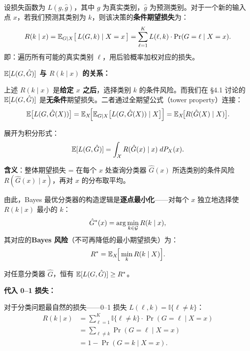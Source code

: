 设损失函数为 $L(g, \hat{g})$，其中 $g$ 为真实类别，$\hat{g}$ 为预测类别。对于一个新的输入点 $x$，若我们预测其类别为 $k$，则该决策的\textbf{条件期望损失}为：
\begin{equation}\label{eq:cond_risk}
    R(k \mid x) = \mathbb{E}_{G\mid X}\big[\,L(G, k) \mid X = x\,\big]
    = \sum_{\ell=1}^{K} L(\ell, k) \cdot \Pr(G = \ell \mid X = x).
\end{equation}
即：遍历所有可能的真实类别 $\ell$，用后验概率加权对应的损失。

\medskip
\noindent\textbf{$\mathbb{E}[L(G, \hat{G})]$ 与 $R(k \mid x)$ 的关系：}

上述 $R(k \mid x)$ 是\textbf{给定 $x$ 之后}，选择类别 $k$ 的条件风险。而我们在 §4.1 讨论的 $\mathbb{E}[L(G, \hat{G})]$ 是\textbf{无条件}期望损失。二者通过全期望公式（tower property）连接：
\begin{equation}\label{eq:tower_risk}
    \mathbb{E}\big[L(G, \hat{G}(X))\big]
    = \mathbb{E}_X\!\Big[\mathbb{E}_{G\mid X}\big[L(G, \hat{G}(X)) \mid X\big]\Big]
    = \mathbb{E}_X\!\big[R(\hat{G}(X) \mid X)\big].
\end{equation}

展开为积分形式：
\[
\mathbb{E}[L(G, \hat{G})] = \int_{\mathcal{X}} R(\hat{G}(x) \mid x) \; dP_X(x).
\]

\textbf{含义}：整体期望损失 = 在每个 $x$ 处查询分类器 $\hat{G}(x)$ 所选类别的条件风险 $R(\hat{G}(x)\mid x)$，再对 $x$ 的分布取平均。

由此，Bayes 最优分类器的构造逻辑是\textbf{逐点最小化}——对每个 $x$ 独立地选择使 $R(k\mid x)$ 最小的 $k$：
\begin{equation}\label{eq:bayes_pointwise}
    \hat{G}^*(x) = \arg\min_{k \in \mathcal{G}} R(k \mid x),
\end{equation}
其对应的\textbf{Bayes 风险}（不可再降低的最小期望损失）为：
\begin{equation}\label{eq:bayes_risk}
    R^* = \mathbb{E}_X\!\Big[\min_{k} R(k \mid X)\Big].
\end{equation}

对任意分类器 $\hat{G}$，恒有 $\mathbb{E}[L(G, \hat{G})] \ge R^*$。

\medskip
\noindent\textbf{代入 0--1 损失：}

对于分类问题最自然的损失——0--1 损失 $L(\ell, k) = \mathbb{I}\{\ell \neq k\}$：
\begin{equation}\label{eq:zero_one_risk}
    \begin{aligned}
    R(k \mid x) &= \sum_{\ell=1}^{K} \mathbb{I}\{\ell \neq k\} \cdot \Pr(G = \ell \mid X = x) \\
    &= \sum_{\ell \neq k} \Pr(G = \ell \mid X = x) \\
    &= 1 - \Pr(G = k \mid X = x).
    \end{aligned}
\end{equation}

